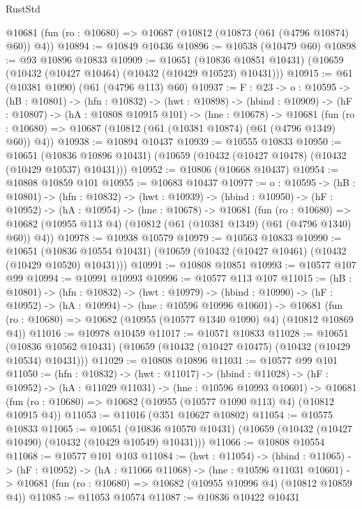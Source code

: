 \begin{lexlean}{RustStd}
\begin{coremodule}
  @10681 (fun (ro : @10680) => @10687 (@10812 (@10873 (@61 (@4796 @10874) @60)) @4))
@10894 := @10849 @10436
@10896 := @10538 (@10479 @60)
@10898 := @93 @10896 @10833
@10909 := @10651
    (@10836 @10851 @10431)
    (@10659 (@10432 (@10427 @10464) (@10432 (@10429 @10523) @10431)))
@10915 := @61 (@10381 @1090) (@61 (@4796 @113) @60)
@10937 := {F : @23} ->
  {o : @10595} ->
  (hB : @10801) ->
  (hfn : @10832) ->
  (hwt : @10898) ->
  (hbind : @10909) ->
  (hF : @10807) ->
  (hA : @10808 @10915 @101) ->
  (hne : @10678) ->
  @10681 (fun (ro : @10680) => @10687 (@10812 (@61 (@10381 @10874) (@61 (@4796 @1349) @60)) @4))
@10938 := @10894 @10437
@10939 := @10555 @10833
@10950 := @10651
    (@10836 @10896 @10431)
    (@10659 (@10432 (@10427 @10478) (@10432 (@10429 @10537) @10431)))
@10952 := @10806 (@10668 @10437)
@10954 := @10808 @10859 @101
@10955 := @10683 @10437
@10977 := {o : @10595} ->
  (hB : @10801) ->
  (hfn : @10832) ->
  (hwt : @10939) ->
  (hbind : @10950) ->
  (hF : @10952) ->
  (hA : @10954) ->
  (hne : @10678) ->
  @10681
    (fun (ro : @10680) =>
    @10682 (@10955 @113 @4) (@10812 (@61 (@10381 @1349) (@61 (@4796 @1340) @60)) @4))
@10978 := @10938 @10579
@10979 := @10563 @10833
@10990 := @10651
    (@10836 @10554 @10431)
    (@10659 (@10432 (@10427 @10461) (@10432 (@10429 @10520) @10431)))
@10991 := @10808 @10851
@10993 := @10577 @107 @99
@10994 := @10991 @10993
@10996 := @10577 @113 @107
@11015 := (hB : @10801) ->
  (hfn : @10832) ->
  (hwt : @10979) ->
  (hbind : @10990) ->
  (hF : @10952) ->
  (hA : @10994) ->
  (hne : @10596 @10996 @10601) ->
  @10681 (fun (ro : @10680) => @10682 (@10955 (@10577 @1340 @1090) @4) (@10812 @10869 @4))
@11016 := @10978 @10459
@11017 := @10571 @10833
@11028 := @10651
    (@10836 @10562 @10431)
    (@10659 (@10432 (@10427 @10475) (@10432 (@10429 @10534) @10431)))
@11029 := @10808 @10896
@11031 := @10577 @99 @101
@11050 := (hfn : @10832) ->
  (hwt : @11017) ->
  (hbind : @11028) ->
  (hF : @10952) ->
  (hA : @11029 @11031) ->
  (hne : @10596 @10993 @10601) ->
  @10681 (fun (ro : @10680) => @10682 (@10955 (@10577 @1090 @113) @4) (@10812 @10915 @4))
@11053 := @11016 (@351 @10627 @10802)
@11054 := @10575 @10833
@11065 := @10651
    (@10836 @10570 @10431)
    (@10659 (@10432 (@10427 @10490) (@10432 (@10429 @10549) @10431)))
@11066 := @10808 @10554
@11068 := @10577 @101 @103
@11084 := (hwt : @11054) ->
  (hbind : @11065) ->
  (hF : @10952) ->
  (hA : @11066 @11068) ->
  (hne : @10596 @11031 @10601) ->
  @10681 (fun (ro : @10680) => @10682 (@10955 @10996 @4) (@10812 @10859 @4))
@11085 := @11053 @10574
@11087 := @10836 @10422 @10431

\end{coremodule}
\end{lexlean}
